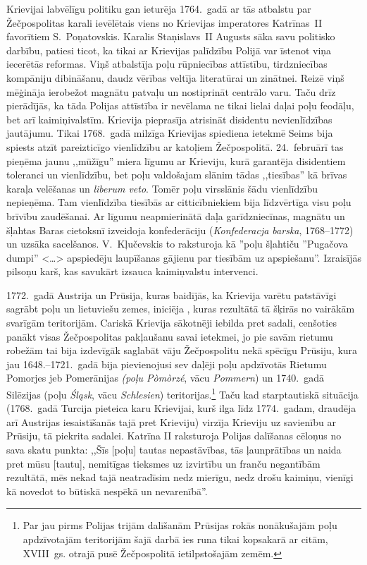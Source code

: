 \documentclass[twoside,a5paper,12pt,fleqn,openany]{extbook}
\newcommand{\pltxti}[1]{\textit{\textpolish{#1}}}
\newcommand{\detxti}[1]{\textit{\textgerman{#1}}}
\newcommand{\latxti}[1]{\textit{\textlatin{#1}}}
\newcommand{\citespace}{<\dots{}>}
\begin{document}
Krievijai labvēlīgu politiku gan ieturēja 1764.~gadā ar tās atbalstu par Žečpospolitas karali ievēlētais viens no Krievijas imperatores Katrīnas~II favorītiem S.~Poņatovskis. Karalis Staņislavs~II Augusts sāka savu politisko darbību, patiesi ticot, ka tikai ar Krievijas palīdzību Polijā var īstenot viņa iecerētās reformas. Viņš atbalstīja poļu rūpniecības attīstību, tirdzniecības kompāniju dibināšanu, daudz vērības veltīja literatūrai un zinātnei. Reizē viņš mēģināja ierobežot magnātu patvaļu un nostiprināt centrālo varu. Taču drīz pierādījās, ka tāda Polijas attīstība ir nevēlama ne tikai lielai daļai poļu feodāļu, bet arī kaimiņivalstīm. Krievija pieprasīja atrisināt disidentu nevienlīdzības jautājumu. Tikai 1768.~gadā milzīga Krievijas spiediena ietekmē Seims bija spiests atzīt pareizticīgo vienlīdzību ar katoļiem Žečpospolitā. 24.~februārī tas pieņēma jaunu ,,mūžīgu'' miera līgumu ar Krieviju, kurā garantēja disidentiem toleranci un vienlīdzību, bet poļu valdošajam slānim tādas ,,tiesības'' kā brīvas karaļa velēšanas un \latxti{liberum veto}. Tomēr poļu virsslānis šādu vienlīdzību nepieņēma. Tam vienlīdzība tiesībās ar citticībniekiem bija līdzvērtīga visu poļu brīvību zaudēšanai. Ar līgumu neapmierinātā daļa garīdzniecīnas, magnātu un šļahtas Baras cietoksnī izveidoja konfederāciju (\pltxti{Konfederacja barska}, 1768--1772) un uzsāka sacelšanos. V.~Kļučevskis to raksturoja kā ''poļu šļahtiču ''Pugačova dumpi'' \citespace{} apspiedēju laupīšanas gājienu par tiesībām uz apspiešanu''. Izraisījās pilsoņu karš, kas savukārt izsauca kaimiņvalstu intervenci.

1772.~gadā Austrija un Prūsija, kuras baidījās, ka Krievija varētu patstāvīgi sagrābt poļu un lietuviešu zemes, iniciēja , kuras rezultātā tā šķirās no vairākām svarīgām teritorijām. Cariskā Krievija sākotnēji iebilda pret sadali, cenšoties panākt visas Žečpospolitas pakļaušanu savai ietekmei, jo pie savām rietumu robežām tai bija izdevīgāk saglabāt vāju Žečpospolitu nekā spēcīgu Prūsiju, kura jau 1648.--1721.~gadā bija pievienojusi sev daļēji poļu apdzīvotās Rietumu Pomorjes jeb Pomerānijas \pltxti{(poļu Pòmòrzé}, vācu \detxti{Pommern}) un 1740.~gadā Silēzijas (poļu \pltxti{Śląsk}, vācu \detxti{Schlesien}) teritorijas.\footnote{Par jau pirms Polijas trijām dalīšanām Prūsijas rokās nonākušajām poļu apdzīvotajām teritorijām šajā darbā ies runa tikai kopsakarā ar citām, XVIII~gs. otrajā pusē Žečpospolitā ietilpstošajām zemēm.} Taču kad starptautiskā situācija (1768.~gadā Turcija pieteica karu Krievijai, kurš ilga līdz 1774.~gadam, draudēja arī Austrijas iesaistīšanās tajā pret Krieviju) virzīja Krieviju uz savienību ar Prūsiju, tā piekrita sadalei. Katrīna II raksturoja Polijas dalīšanas cēloņus no sava skatu punkta: ,,Šīs [poļu] tautas nepastāvības, tās ļaunprātības un naida pret mūsu [tautu], nemitīgas tieksmes uz izvirtību un franču negantībām rezultātā, mēs nekad tajā neatradīsim nedz mierīgu, nedz drošu kaimiņu, vienīgi kā novedot to būtiskā nespēkā un nevarenībā''.
\end{document}
